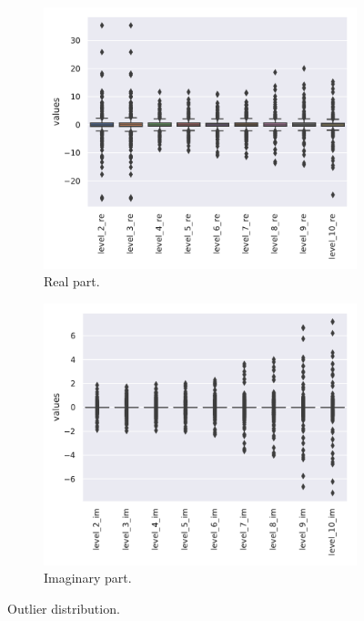 \begin{figure}[htbp]
  \centering
  \begin{subfigure}{0.45\textwidth}
    \centering
    \includegraphics[width=\linewidth]{img/var_box_re}
    \caption{Real part.}
  \end{subfigure}
  \begin{subfigure}{0.45\textwidth}
    \centering
    \includegraphics[width=\linewidth]{img/var_box_im}
    \caption{Imaginary part.}
  \end{subfigure}
  \caption{Outlier distribution.}
  \label{fig:wzw:outliers}
\end{figure}

